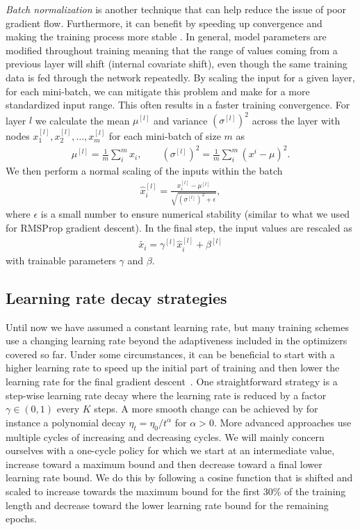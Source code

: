 \textit{Batch normalization} is another technique that can help reduce the issue of poor gradient flow. Furthermore, it can benefit by speeding up convergence and making the training process more stable \cite{ioffe2015batch}. In general, model parameters are modified throughout training meaning that the range of values coming from a previous layer will shift (internal covariate shift), even though the same training data is fed through the network repeatedly. By scaling the input for a given layer, for each mini-batch, we can mitigate this problem and make for a more standardized input range. This often results in a faster training convergence. For layer $l$ we calculate the mean $\mu^{[l]}$ and variance $(\sigma^{[l]})^{2}$ across the layer with nodes $x_1^{[l]}, x_2^{[l]}, \ldots, x_m^{[l]}$ for each mini-batch of size $m$ as
\begin{align*}
  \mu^{[l]} = \frac{1}{m} \sum_i^m x_i, \qquad (\sigma^{[l]})^{2} = \frac{1}{m} \sum_i^m (x^i-\mu)^2.
\end{align*}
We then perform a normal scaling of the inputs within the batch
\begin{align*}
  \hat{x}_i^{[l]} = \frac{x_i^{[l]} - \mu^{[l]}}{\sqrt{(\sigma^{[l]})^{2} + \epsilon}},
\end{align*}
where $\epsilon$ is a small number to ensure numerical stability (similar to what we used for \acrshort{RMSProp} gradient descent). In the final step, the input values are rescaled as
\begin{align*}
  \tilde{x_i} = \gamma^{[l]} \hat{x}_i^{[l]} + \beta^{[l]}
\end{align*}
with trainable parameters $\gamma$ and $\beta$. 

\subsection{Learning rate decay strategies}
Until now we have assumed a constant learning rate, but many training schemes use a changing learning rate beyond the adaptiveness included in the optimizers covered so far. Under some circumstances, it can be beneficial to start with a higher learning rate to speed up the initial part of training and then lower the learning rate for the final gradient descent~\cite{smith2018disciplined}. One straightforward strategy is a step-wise learning rate decay where the learning rate is reduced by a factor $\gamma \in (0,1)$ every $K$ steps. A more smooth change can be achieved by for instance a polynomial decay $\eta_t = \eta_0/t^{\alpha}$ for $\alpha > 0$. More advanced approaches use multiple cycles of increasing and decreasing cycles. We will mainly concern ourselves with a one-cycle policy for which we start at an
intermediate value, increase toward a maximum bound and then decrease toward a
final lower learning rate bound. We do this by following a cosine function that is shifted and scaled to increase towards the maximum bound for the first 30\% of the training length and decrease toward the lower learning rate bound for the remaining epochs. 


